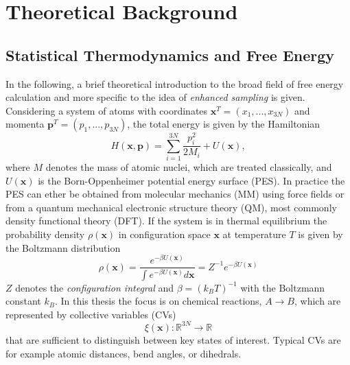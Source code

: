 \chapter{Theoretical Background}
\label{cha:theory}

\section{Statistical Thermodynamics and Free Energy}
\label{sec:freeE}
In the following, a brief theoretical introduction to the broad field of free energy calculation\autocite{chipot2007free} and more specific to the idea of \textit{enhanced sampling}\autocite{bernardi2015enhanced,abrams2014enhanced} is given.
Considering a system of atoms with coordinates $\textbf{x}^T=(x_1,...,x_{3N})$ and momenta $\textbf{p}^T=(p_1,...,p_{3N})$, the total energy is given by the Hamiltonian
\begin{equation}
  H(\textbf{x},\textbf{p})=\sum_{i=1}^{3N}\frac{p_{i}^{ 2}}{2 M_i} + U(\textbf{x}),
  \label{eq:lagrangian}
\end{equation}
where $M$ denotes the mass of atomic nuclei, which are treated classically, and $U(\textbf{x})$ is the Born-Oppenheimer potential energy surface (PES).\autocite{combes1981born}
In practice the PES can ether be obtained from molecular mechanics (MM) using force fields\autocite{ponder2003force} or from a quantum mechanical electronic structure theory (QM), most commonly density functional theory (DFT).\autocite{burke2012perspective}
If the system is in thermal equilibrium the probability density $\rho(\textbf{x})$ in configuration space $\textbf{x}$ at temperature $T$ is given by the Boltzmann distribution
\begin{equation}
  \rho(\textbf{x})=\frac{e^{-\beta U(\textbf{x})}}{\int e^{-\beta U(\textbf{x})} d\textbf{x}}=Z^{-1}e^{-\beta U(\textbf{x})}
  \label{eq:boltzmann}
\end{equation}
$Z$ denotes the \textit{configuration integral} and $\beta=(k_B T)^{-1}$ with the Boltzmann constant $k_B$.\autocite{chipot2007free}
In this thesis the focus is on chemical reactions, $A \longrightarrow B$, which are represented by collective variables (CVs)
\begin{equation}
 \xi(\textbf{x}) : \mathbb{R} ^{3N} \to \mathbb{R}
\end{equation}
that are sufficient to distinguish between key states of interest.
Typical CVs are for example atomic distances, bend angles, or dihedrals.\autocite{fiorin2013using}
